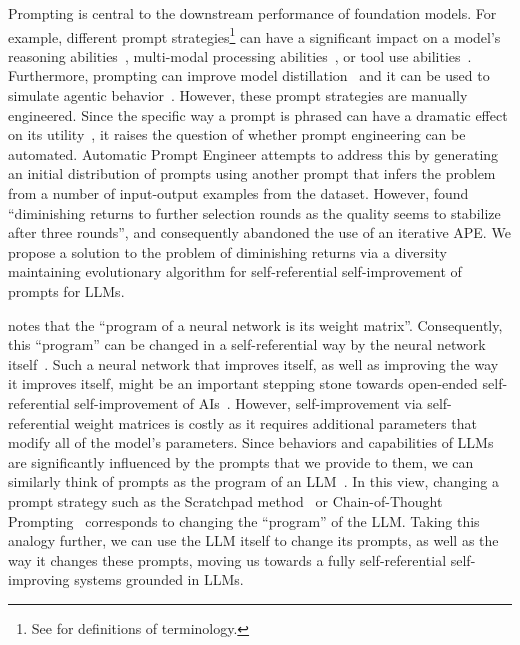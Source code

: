 \documentclass{article} %
\begin{document}
Prompting is central to the downstream performance of foundation models. For example, different prompt strategies\footnote{See  for definitions of terminology.} can have a significant impact on a model's reasoning abilities~\citep{DBLP:conf/nips/Wei0SBIXCLZ22,DBLP:journals/corr/abs-2112-00114,zhou2022least,wang2022self,zhou2022large,DBLP:conf/acl/WangXLHLLL23}, multi-modal processing abilities~\citep{yang2023mm,DBLP:journals/corr/abs-2302-01560}, or tool use abilities~\citep{yao2022react,schick2023toolformer}. Furthermore, prompting can improve model distillation~\citep{DBLP:conf/acl/WangKMLSKH23,DBLP:conf/acl/HsiehLYNFRKLP23} and it can be used to simulate agentic behavior~\citep{DBLP:journals/corr/abs-2305-16291,DBLP:journals/corr/abs-2304-03442,DBLP:journals/corr/abs-2305-15486}. However, these prompt strategies are manually engineered. Since the specific way a prompt is phrased can have a dramatic effect on its utility~\citep{DBLP:journals/corr/abs-2209-07686}, it raises the question of whether prompt engineering can be automated. Automatic Prompt Engineer \citep[APE,][]{zhou2022large} attempts to address this by generating an initial distribution of prompts using another prompt that infers the problem from a number of input-output examples from the dataset. However, \citeauthor{zhou2022large} found ``diminishing returns to further selection rounds as the quality seems to stabilize after three rounds'', and consequently abandoned the use of an iterative APE. We propose a solution to the problem of diminishing returns via a diversity maintaining evolutionary algorithm for self-referential self-improvement of prompts for LLMs.  

\citet{schmidhuber1990making} notes that the ``program of a neural network is its weight matrix''. Consequently, this ``program'' can be changed in a self-referential way by the neural network itself~\citep{schmidhuber1993selfreferential,DBLP:conf/icml/IrieSCS22}. Such a neural network that improves itself, as well as improving the way it improves itself, might be an important stepping stone towards open-ended self-referential self-improvement of AIs~\citep{schmidhuber2003godel}. However, self-improvement via self-referential weight matrices is costly as it requires additional parameters that modify all of the model's parameters. Since behaviors and capabilities of LLMs are significantly influenced by the prompts that we provide to them, we can similarly think of prompts as the program of an LLM~\citep{zhou2022large}. In this view, changing a prompt strategy such as the Scratchpad method~\citep{DBLP:journals/corr/abs-2112-00114} or Chain-of-Thought Prompting~\citep{DBLP:conf/nips/Wei0SBIXCLZ22} corresponds to changing the ``program'' of the LLM. Taking this analogy further, we can use the LLM itself to change its prompts, as well as the way it changes these prompts, moving us towards a fully self-referential self-improving systems grounded in LLMs.
\end{document}
